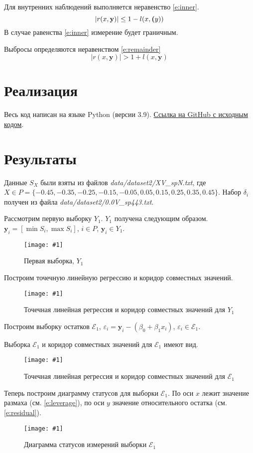 \documentclass[a4paper,12pt]{article}
\newcommand{\plot}[3]{
    \begin{figure}[H]
        \begin{center}
            \texttt{[image: \#1]}
            \caption{#2}
            \label{#3}
        \end{center}
    \end{figure}
}
\begin{document}
    Для внутренних наблюдений выполняется неравенство \ref{e:inner}.
    \begin{equation}
        |r(x, \textbf{y})| \leq 1 - l(x, \textbf(y))
        \label{e:inner}
    \end{equation}
    В случае равенства \ref{e:inner} измерение будет граничным.

    Выбросы определяются неравенством \ref{e:remainder}
    \begin{equation}
        |r(x, \textbf{y})| > 1 + l(x, \textbf{y})
        \label{e:remainder}
    \end{equation}

    \section{Реализация}
    \quad Весь код написан на языке Python (версии 3.9).
    \href{https://github.com/gobdr/interval_data_analysis/tree/master/lab3}{Ссылка на GitHub с исходным кодом}.

    \section{Результаты}
    \quad Данные $ S_X $ были взяты из файлов \textsl{data/dataset2/XV\_spN.txt}, \newline
    где $ X \in P = \{-0.45, -0.35, -0.25, -0.15, -0.05, 0.05, 0.15, 0.25, 0.35, 0.45 \} $.
    Набор $ \delta_i $ получен из файла \textsl{data/dataset2/0.0V\_sp443.txt}.

    Рассмотрим первую выборку $ Y_1 $. $ Y_1 $ получена следующим образом.
    $ \textbf{y}_i = [\min{S_i}, \max{S_i}]$, $ i \in P $, $ \textbf{y}_i \in Y_1 $.
    \plot{SampleX1}{Первая выборка, $ Y_1 $}{p:sampleX1}

    Построим точечную линейную регрессию и коридор совместных значений.
    \plot{InformSetCorridorX1}{Точечная линейная регрессия и коридор совместных значений для $ Y_1 $}{p:informSetCorridorX1}

    Построим выборку остатков $ \mathcal{E}_1 $, $ \varepsilon_i = \textbf{y}_i - (\beta_0 + \beta_1 x_i) $,
    $ \varepsilon_i \in \mathcal{E}_1 $.

    Выборка $ \mathcal{E}_1 $ и коридор совместных значений для $ \mathcal{E}_1 $ имеют вид.
    \plot{InformSetCorridorRemX1}{Точечная линейная регрессия и коридор совместных значений для $ \mathcal{E}_1 $}{p:informSetCorridorRemX1}

    Теперь построим диаграмму статусов для выборки $ \mathcal{E}_1 $.
    По оси $ x $ лежит значение размаха (см. \ref{e:leverage}), по оси $ y $ значение относительного остатка (см. \ref{e:residual}).
    \plot{DiagramStatusX1}{Диаграмма статусов измерений выборки $ \mathcal{E}_1 $}{p:diagramStatusX1}
\end{document}
